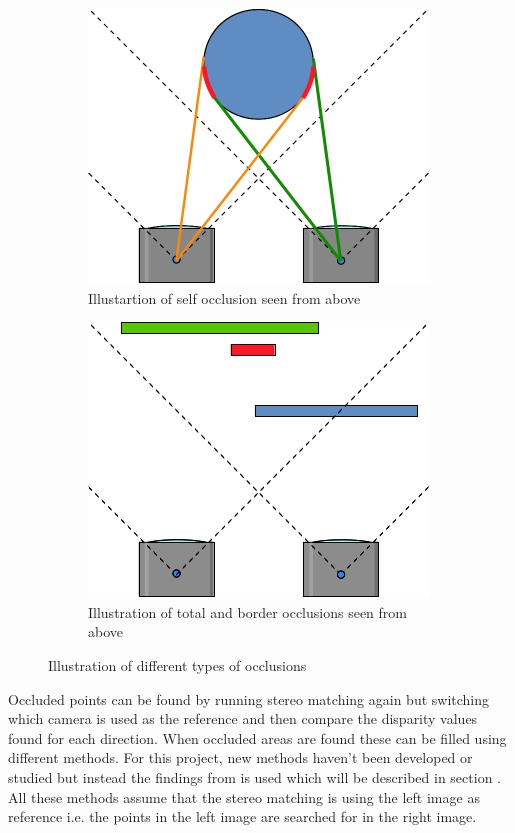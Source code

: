 \begin{figure}[ht!]
  \centering
  \begin{subfigure}[t]{0.45\textwidth}
    \centering\includegraphics[scale=0.4]{figures/occlself.jpg}
    \caption{Illustartion of self occlusion seen from above\label{fig:occlself}}
  \end{subfigure}\hspace{0.5cm}
  \begin{subfigure}[t]{0.45\textwidth}
    \centering\includegraphics[scale=0.4]{figures/occltotalborder}
    \caption{Illustration of total and border occlusions seen from above\label{fig:occltb}}
  \end{subfigure}
  \caption{Illustration of different types of occlusions\label{fig:occltypes}}
\end{figure}

Occluded points can be found by running stereo matching again but switching which camera is used as the reference and then compare the disparity values found for each direction. When occluded areas are found these can be filled using different methods. For this project, new methods haven't been developed or studied but instead the findings from \cite{huq2013occlusion} is used which will be described in section . All these methods assume that the stereo matching is using the left image as reference i.e. the points in the left image are searched for in the right image. 


